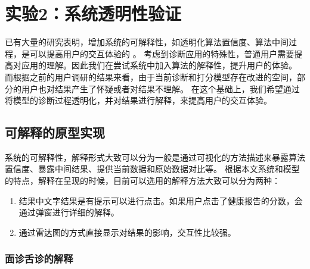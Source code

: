 \section{实验2：系统透明性验证}

已有大量的研究表明，增加系统的可解释性，如透明化算法置信度、算法中间过程，是可以提高用户的交互体验的 \cite{wang2019designing}\cite{lim2009and}。
考虑到诊断应用的特殊性，普通用户需要提高对应用的理解。因此我们在尝试系统中加入算法的解释性，提升用户的体验。
而根据之前的用户调研的结果来看，由于当前诊断和打分模型存在改进的空间，部分的用户也对结果产生了怀疑或者对结果不理解。
在这个基础上，我们希望通过将模型的诊断过程透明化，并对结果进行解释，来提高用户的交互体验。

\subsection{可解释的原型实现}
系统的可解释性，解释形式大致可以分为一般是通过可视化的方法描述来暴露算法置信度、暴露中间结果、提供当前数据和原始数据对比等\cite{wang2019designing}。
根据本文系统和模型的特点\cite{kocielnik2019will}，解释在呈现的时候，目前可以选用的解释方法大致可以分为两种：

\begin{enumerate}
    \item 结果中文字结果是有提示可以进行点击。如果用户点击了健康报告的分数，会通过弹窗进行详细的解释。

    \item 通过雷达图的方式直接显示对结果的影响，交互性比较强。 
\end{enumerate}


\subsubsection{面诊舌诊的解释}


